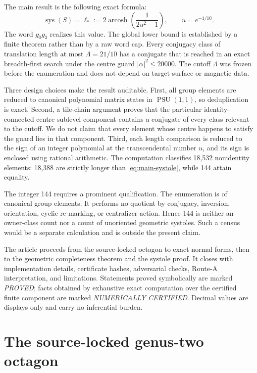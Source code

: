 \documentclass[11pt,a4paper]{article}
\theoremstyle{definition}
\newcommand{\PSU}{\operatorname{PSU}}
\newcommand{\arcosh}{\operatorname{arcosh}}
\newcommand{\sys}{\operatorname{sys}}
\newcommand{\length}{\ell}
\begin{document}
The main result is the following exact formula:
\begin{equation}\label{eq:main-systole}
 \sys(S)=\length_*
 :=2\arcosh\!\left(\frac{1}{2u^2-1}\right),
 \qquad u=e^{-1/10}.
\end{equation}
The word \(g_0g_3\) realizes this value.  The global lower bound is established
by a finite theorem rather than by a raw word cap.  Every conjugacy class of
translation length at most
\(\Lambda=21/10\) has a conjugate that is reached in an exact
breadth-first search under the centre guard
\(\lvert\alpha\rvert^2\leq20000\).  The cutoff \(\Lambda\) was frozen before
the enumeration and does not depend on target-surface or magnetic data.

Three design choices make the result auditable.  First, all group elements
are reduced to canonical polynomial matrix states in \(\PSU(1,1)\), so
deduplication is exact.  Second, a tile-chain argument proves that the
particular identity-connected centre sublevel component contains a conjugate
of every class relevant to the cutoff.  We do not claim that every element
whose centre happens to satisfy the guard lies in that component.  Third,
each length comparison is reduced to the sign of an integer polynomial at
the transcendental number \(u\), and its sign is enclosed using rational
arithmetic.  The computation classifies 18,532 nonidentity elements: 18,388
are strictly longer than \eqref{eq:main-systole}, while 144 attain equality.

The integer 144 requires a prominent qualification.  The enumeration is of
canonical group elements.  It performs no quotient by conjugacy, inversion,
orientation, cyclic re-marking, or centralizer action.  Hence 144 is neither
an owner-class count nor a count of unoriented geometric systoles.  Such a
census would be a separate calculation and is outside the present claim.

The article proceeds from the source-locked octagon to exact normal forms,
then to the geometric completeness theorem and the systole proof.  It closes
with implementation details, certificate hashes, adversarial checks, Route-A
interpretation, and limitations.  Statements proved symbolically are marked
\emph{PROVED}; facts obtained by exhaustive exact computation over the
certified finite component are marked \emph{NUMERICALLY CERTIFIED}.  Decimal
values are displays only and carry no inferential burden.

\section{The source-locked genus-two octagon}
\label{sec:surface}
\end{document}
